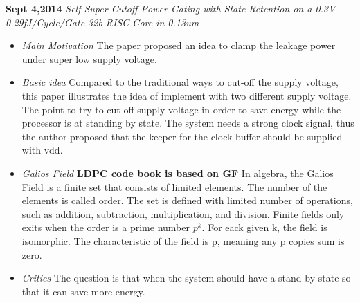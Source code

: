 \documentclass[]{article}
\begin{document}
\noindent \textbf{Sept 4,2014}
\textit{Self-Super-Cutoff Power Gating with State Retention on a 0.3V 0.29fJ/Cycle/Gate 32b RISC Core in 0.13um}
\indent		\begin{itemize}
            \item \textit{Main Motivation} The paper proposed an idea to clamp the leakage power under super low supply voltage.

            \item \textit{Basic idea} 
            Compared to the traditional ways to cut-off the supply voltage, this paper illustrates the idea of implement with two different supply voltage.
            The point to try to cut off supply voltage in order to save energy while the processor is at standing by state.
            The system needs a strong clock signal, thus the author proposed that the keeper for the clock buffer should be supplied with vdd.

            \item \textit{Galios Field} 
            \textbf{LDPC code book is based on GF}
            In algebra, the Galios Field is a finite set that consists of limited elements.
            The number of the elements is called order.
            The set is defined with limited number of operations, such as addition, subtraction, multiplication, and division.
            Finite fields only exits when the order is a prime number $p^{k}$.
            For eack given k, the field is isomorphic.
            The characteristic of the field is p, meaning any p copies sum is zero.

            \item \textit{Critics} 
            The question is that when the system should have a stand-by state so that it can save more energy.

        \end{itemize}
\end{document}
